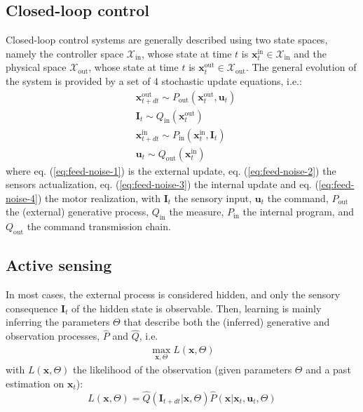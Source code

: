 \documentclass[11pt]{article}
\begin{document}
\subsection{Closed-loop control}
Closed-loop control systems are generally described using two state spaces, namely the controller space $\mathcal{X}_\text{in}$, whose state at time $t$ is $\boldsymbol{x}^\text{in}_t \in\mathcal{X}_\text{in} $ and the physical space $\mathcal{X}_\text{out}$, whose state at time $t$ is $\boldsymbol{x}^\text{out}_t \in\mathcal{X}_\text{out}$. The general evolution of the system is provided by a set of 4 stochastic update equations, i.e.:
  \begin{align}
  &{\boldsymbol{x}}^\text{out}_{t+dt} \sim P_\text{out}(\boldsymbol{x}^\text{out}_t,\boldsymbol{u}_t) \label{eq:feed-noise-1} \\
  &\boldsymbol{I}_t \sim Q_\text{in}(\boldsymbol{x}^\text{out}_t) \label{eq:feed-noise-2}\\
  &{\boldsymbol{x}}^\text{in}_{t+dt} \sim P_\text{in}(\boldsymbol{x}^\text{in}_t,\boldsymbol{I}_t) \label{eq:feed-noise-3} \\
  &\boldsymbol{u}_t \sim Q_\text{out}(\boldsymbol{x}^\text{in}_t) \label{eq:feed-noise-4}
  \end{align}
where eq. (\ref{eq:feed-noise-1}) is the external update,  eq. (\ref{eq:feed-noise-2}) the sensors actualization, eq. (\ref{eq:feed-noise-3}) the internal update and  eq. (\ref{eq:feed-noise-4})  the motor realization, with $\boldsymbol{I}_ t$ the sensory input,  $\boldsymbol{u}_t$ the command, $P_\text{out}$ the (external) generative process, $Q_\text{in}$ the measure, $P_\text{in}$ the internal program, and  $Q_\text{out}$ the command transmission chain. 


\subsection{Active sensing}

In most cases, the external process is considered hidden, and only the sensory consequence $\boldsymbol{I}_t$ of the hidden state is observable. Then, learning is mainly inferring the parameters $\Theta$ that describe both the (inferred) generative and observation processes, $\hat{P}$ and $\hat{Q}$, i.e. 
\begin{align}
\max_{\boldsymbol{x},\Theta} L(\boldsymbol{x},\Theta)
\end{align}
with  $L(\boldsymbol{x},\Theta)$ the likelihood of the observation (given parameters $\Theta$ and a past estimation on $\boldsymbol{x}_t$):
\begin{equation}
L(\boldsymbol{x},\Theta) = \hat{Q}(\boldsymbol{I}_{t+dt}|{\boldsymbol{x}},\Theta)\hat{P}({\boldsymbol{x}}|{\boldsymbol{x}}_t,\boldsymbol{u}_t,\Theta) \label{eq:lik}
\end{equation}
\end{document}
